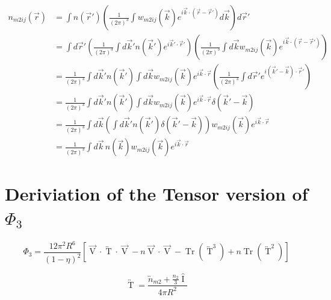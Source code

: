 \documentclass[double,12pt]{beavtex}
\begin{document}
\begin{align}
    n_{m2ij}(\vec r) &= \int n(\vec r') \left(\frac{1}{\left(2\pi\right)^3}\int w_{m2ij}(\vec k)e^{i\vec k\cdot (\vec r-\vec r')}d\vec{k}\right)d\vec r' \\
    &= \int d\vec r' \left(\frac{1}{\left(2\pi\right)^3}\int d\vec k' n(\vec k')e^{i\vec k'\cdot \vec r'}\right) \left(\frac{1}{\left(2\pi\right)^3}\int d\vec k w_{m2ij}(\vec k)e^{i\vec k\cdot (\vec r-\vec r')}\right) \\
    &=  \frac{1}{\left(2\pi\right)^3}\int d\vec k' n(\vec k') \int d\vec k w_{m2ij}(\vec k)
    e^{i\vec k\cdot \vec r}\left(\frac{1}{\left(2\pi\right)^3}\int d\vec r'e^{i(\vec k'-\vec k)\cdot \vec r'}\right)
    \\
   &= \frac{1}{\left(2\pi\right)^3}\int d\vec k' n(\vec k') \int d\vec k w_{m2ij}(\vec k)e^{i\vec k\cdot \vec r}\delta(\vec k'-\vec k) \\
    &= \frac{1}{\left(2\pi\right)^3}\int d\vec k \left(\int d\vec k' n(\vec k')\delta(\vec k'-\vec k)\right) w_{m2ij}(\vec k)e^{i\vec k\cdot \vec r}
    \\
    &= \frac{1}{\left(2\pi\right)^3}\int d\vec k\, n(\vec k) w_{m2ij}(\vec k)e^{i\vec k\cdot \vec r}
  \end{align} 

\section{Deriviation of the Tensor version of $\Phi_3$}

\begin{equation}{\Phi_3=\frac{12\pi^2R^6}{(1-\eta)^2}\left[\overrightarrow{\operatorname{V}}\cdot\overleftrightarrow{\operatorname{T}}\cdot\overrightarrow{\operatorname{V}}-n\overrightarrow{\operatorname{V}}\cdot\overrightarrow{\operatorname{V}}-\operatorname{Tr}\left(\overleftrightarrow{\operatorname{T}}^3\right)+n\operatorname{Tr}\left(\overleftrightarrow{\operatorname{T}}^2\right)\right]}\end{equation}

\begin{equation}{\overleftrightarrow{\operatorname{T}}=\frac{{\overleftrightarrow{n}_{m2}}+\frac{n_2}{3}\hat{\operatorname{I}}}{4\pi{R}^2}}\end{equation}
\end{document}
